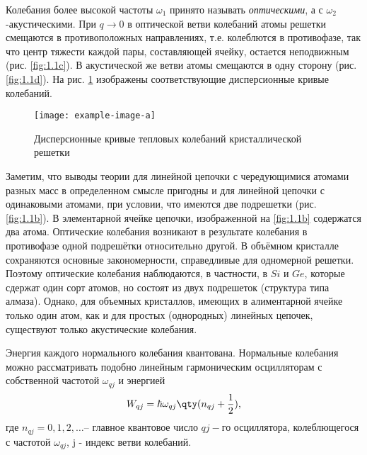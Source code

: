 Колебания более высокой частоты $\omega_1$  принято называть \textit{оптическими}, а 
с $\omega_2$-акустическими. При $q\rightarrow 0$ в оптической ветви колебаний атомы 
решетки смещаются в противоположных направлениях, т.е. колеблются в противофазе, так что
центр тяжести каждой пары, составляющей ячейку, остается неподвижным
(рис. \ref{fig:1.1c}). В акустической же ветви атомы смещаются в одну сторону
(рис. \ref{fig:1.1d}). На рис. \ref{fig:2} изображены соответствующие дисперсионные кривые колебаний.
\begin{figure}[h!]
	\centering
	\texttt{[image: example-image-a]}
	\caption{Дисперсионные кривые тепловых колебаний кристаллической решетки}
	\label{fig:2}
\end{figure}

Заметим, что выводы теории для линейной цепочки с чередующимися атомами разных масс в определенном смысле пригодны и для линейной цепочки с одинаковыми атомами, при условии, что имеются две подрешетки (рис. \ref{fig:1.1b}). В элементарной ячейке цепочки, изображенной на \ref{fig:1.1b} содержатся два атома. Оптические колебания возникают 
в результате колебания в противофазе одной подрешётки  относительно другой. В объёмном кристалле сохраняются основные закономерности, справедливые для одномерной решетки. Поэтому оптические колебания наблюдаются, в частности, в $Si$ и $Ge$, которые сдержат один
сорт атомов, но состоят из двух подрешеток (структура типа алмаза). Однако,
для объемных кристаллов, имеющих в алиментарной ячейке только один атом,
как и для простых (однородных) линейных цепочек, существуют только акустические колебания.

Энергия каждого нормального колебания квантована. Нормальные колебания  можно рассматривать подобно линейным гармоническим осцилляторам с собственной частотой $\omega_{qj}$ и энергией
\begin{equation}
	W_{qj}=\hbar \omega_{qj}\qty(n_{qj}+\frac12),
\end{equation}
где $n_{qj}=0,1,2,\dots$-- главное квантовое число $qj-$го осциллятора, колеблющегося с частотой
$\omega_{qj}$, j - индекс ветви колебаний. 

